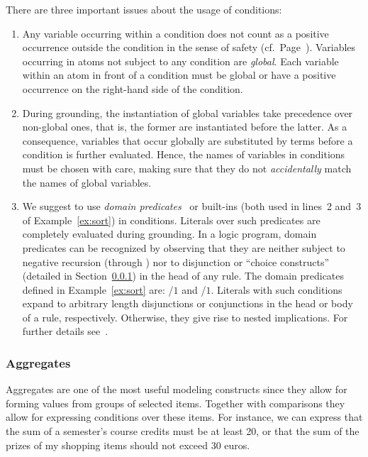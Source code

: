 \begin{note}
There are three important issues about the usage of conditions:
\begin{enumerate}
%
\item
Any variable occurring within a condition
does not count as a positive occurrence outside the condition
in the sense of safety (cf.\ Page~\pageref{pg:safe}).
Variables occurring in atoms not subject to any condition are \emph{global}.
Each variable within an atom in front of a condition
must be global or have a positive occurrence on the right-hand side of
the condition.
%
\item
During grounding,
the instantiation of global variables take precedence over non-global ones,
that is, the former are instantiated before the latter.
As a consequence, variables that occur globally are substituted by terms
before a condition is further evaluated.
Hence, the names of variables in conditions must be chosen with care,
making sure that they do not \emph{accidentally} match the names of global variables.
%
\item
We suggest to use \emph{domain predicates}~\cite{lparseManual}
or built-ins (both used in lines~2 and~3  of Example~\ref{ex:sort})
in conditions.
%
%
\label{pg:domain}%
Literals over such predicates are completely evaluated during grounding.
In a logic program, domain predicates can be recognized by observing
that they are neither subject to negative recursion (through )
nor to disjunction or ``choice constructs'' (detailed in Section~\ref{subsec:gringo:aggregate})
in the head of any rule.
The domain predicates defined in Example~\ref{ex:sort} are:
/$1$ and /$1$.
Literals with such conditions expand to arbitrary length disjunctions or conjunctions in the head or body of a rule, respectively.
Otherwise, they give rise to nested implications.
For further details see~\cite{haliya14a}.
\end{enumerate}
\end{note}

\subsubsection{Aggregates}\label{subsec:gringo:aggregate}

Aggregates are one of the most useful modeling constructs since they allow for forming values from groups of selected items.
Together with comparisons they allow for expressing conditions over these items.
For instance, we can express that the sum of a semester's course credits must be at least 20,
or that the sum of the prizes of my shopping items should not exceed 30 euros.

